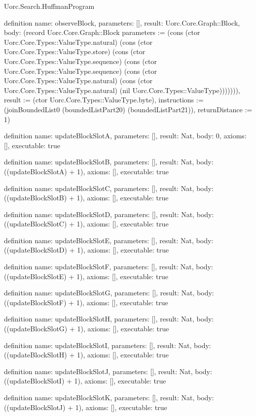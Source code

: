 \begin{lexlean}{Uorc.Search.HuffmanProgram}
\begin{semanticmodule}
definition{
  name: observeBlock,
  parameters: [],
  result: Uorc.Core.Graph::Block,
  body: (record Uorc.Core.Graph::Block {parameters := (cons (ctor Uorc.Core.Types::ValueType.natural) (cons (ctor Uorc.Core.Types::ValueType.store) (cons (ctor Uorc.Core.Types::ValueType.sequence) (cons (ctor Uorc.Core.Types::ValueType.sequence) (cons (ctor Uorc.Core.Types::ValueType.natural) (cons (ctor Uorc.Core.Types::ValueType.natural) (nil Uorc.Core.Types::ValueType))))))), result := (ctor Uorc.Core.Types::ValueType.byte), instructions := (joinBoundedList0 (boundedListPart20) (boundedListPart21)), returnDistance := 1})
}

definition{
  name: updateBlockSlotA,
  parameters: [],
  result: Nat,
  body: 0,
  axioms: [],
  executable: true
}

definition{
  name: updateBlockSlotB,
  parameters: [],
  result: Nat,
  body: ((updateBlockSlotA) + 1),
  axioms: [],
  executable: true
}

definition{
  name: updateBlockSlotC,
  parameters: [],
  result: Nat,
  body: ((updateBlockSlotB) + 1),
  axioms: [],
  executable: true
}

definition{
  name: updateBlockSlotD,
  parameters: [],
  result: Nat,
  body: ((updateBlockSlotC) + 1),
  axioms: [],
  executable: true
}

definition{
  name: updateBlockSlotE,
  parameters: [],
  result: Nat,
  body: ((updateBlockSlotD) + 1),
  axioms: [],
  executable: true
}

definition{
  name: updateBlockSlotF,
  parameters: [],
  result: Nat,
  body: ((updateBlockSlotE) + 1),
  axioms: [],
  executable: true
}

definition{
  name: updateBlockSlotG,
  parameters: [],
  result: Nat,
  body: ((updateBlockSlotF) + 1),
  axioms: [],
  executable: true
}

definition{
  name: updateBlockSlotH,
  parameters: [],
  result: Nat,
  body: ((updateBlockSlotG) + 1),
  axioms: [],
  executable: true
}

definition{
  name: updateBlockSlotI,
  parameters: [],
  result: Nat,
  body: ((updateBlockSlotH) + 1),
  axioms: [],
  executable: true
}

definition{
  name: updateBlockSlotJ,
  parameters: [],
  result: Nat,
  body: ((updateBlockSlotI) + 1),
  axioms: [],
  executable: true
}

definition{
  name: updateBlockSlotK,
  parameters: [],
  result: Nat,
  body: ((updateBlockSlotJ) + 1),
  axioms: [],
  executable: true
}


\end{semanticmodule}
\end{lexlean}
